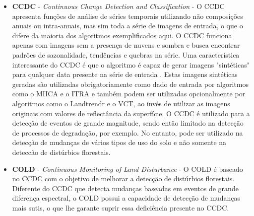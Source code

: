 \documentclass[12pt,a4paper]{article}
\begin{document}
\begin{itemize}
  \item \textbf{CCDC} - \textit{Continuous Change Detection and Classification} \citep{ZHU2014152} - O CCDC apresenta funções de análise de séries temporais utilizando não composições anuais ou intra-anuais, mas sim toda a série de imagens de entrada, o que o difere da maioria dos algoritmos exemplificados aqui. O CCDC funciona apenas com imagens sem a presença de nuvens e sombra e busca encontrar padrões de sazonalidade, tendências e quebras na série. Uma característica interessante do CCDC é que o algoritmo é capaz de gerar imagens "sintéticas" para qualquer data presente na série de entrada \citep{ZHU201567}. Estas imagens sintéticas geradas são utilizadas obrigatoriamente como dado de entrada por algoritmos como o MIICA e o ITRA e também podem ser utilizadas opcionalmente por algoritmos como o Landtrendr e o VCT, ao invés de utilizar as imagens originais com valores de reflectância da superfície. O CCDC é utilizado para a detecção de eventos de grande magnitude, sendo então limitado na detecção de processos de degradação, por exemplo. No entanto, pode ser utilizado na detecção de mudanças de vários tipos de uso do solo e não somente na deteccão de distúrbios florestais.
  
  \item \textbf{COLD} - \textit{Continuous Monitoring of Land Disturbance} \citep{Cohen2020} - O COLD é baseado no CCDC com o objetivo de melhorar a detecção de distúrbios florestais. Diferente do CCDC que detecta mudanças baseadas em eventos de grande diferença espectral, o COLD possui a capacidade de detecção de mudanças mais sutis, o que lhe garante suprir essa deficiência presente no CCDC.
  

\end{itemize}
\end{document}
